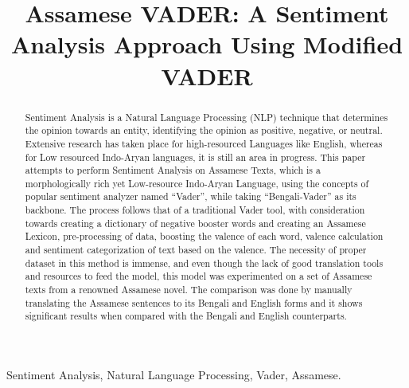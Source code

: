 \documentclass[conference]{IEEEtran}
\begin{document}
\title{Assamese VADER: A Sentiment Analysis Approach Using Modified VADER\\
}

\author{
\and
{}
\and
{}

}

\maketitle

\begin{abstract}
Sentiment Analysis is a Natural Language Processing (NLP) technique that determines the opinion towards an entity, identifying the opinion as positive, negative, or neutral. Extensive research has taken place for high-resourced Languages like English, whereas for Low resourced Indo-Aryan languages, it is still an area in progress. This paper attempts to perform Sentiment Analysis on Assamese Texts, which is a morphologically rich yet Low-resource Indo-Aryan Language, using the concepts of popular sentiment analyzer named ``Vader”, while taking ``Bengali-Vader” as its backbone. The process follows that of a traditional Vader tool, with consideration towards creating a dictionary of negative booster words and creating an Assamese Lexicon, pre-processing of data, boosting the valence of each word, valence calculation and sentiment categorization of text based on the valence. The necessity of proper dataset in this method is immense, and even though the lack of good translation tools and resources to feed the model, this model was experimented on a set of Assamese texts from a renowned Assamese novel. The comparison was done by manually translating the Assamese sentences to its Bengali and English forms and it shows significant results when compared with the Bengali and English counterparts.
\end{abstract}

\begin{IEEEkeywords}
Sentiment Analysis, Natural Language Processing, Vader, Assamese.
\end{IEEEkeywords}
\end{document}
